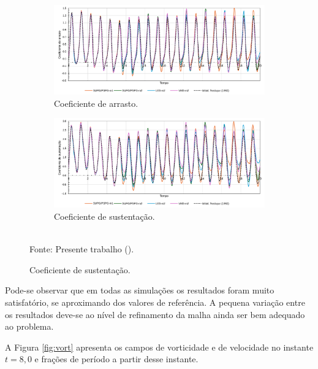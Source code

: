 \begin{figure}[h!]
    \centering
    \caption{Aerofólio com movimento de arfagem - Evolução temporal de $C_D$ e $C_L$.}
    \begin{subfigure}{\linewidth}
        \includegraphics[width=\linewidth]{Figuras/rotating-airfoil/Cd.pdf}
        \caption{Coeficiente de arrasto.}
    \end{subfigure}
    \begin{subfigure}{\linewidth}
        \includegraphics[width=\linewidth]{Figuras/rotating-airfoil/Cl.pdf}
        \caption{Coeficiente de sustentação.}
    \end{subfigure}
    \\Fonte: Presente trabalho (\the\year).
    \label{fig:rotating-airfoil-Coef}
\end{figure}

Pode-se observar que em todas as simulações os resultados foram muito satisfatório, se aproximando dos valores de referência. A pequena variação entre os resultados deve-se ao nível de refinamento da malha ainda ser bem adequado ao problema.

A Figura \ref{fig:vort} apresenta os campos de vorticidade e de velocidade no instante $t=8,0$ e frações de período a partir desse instante.


